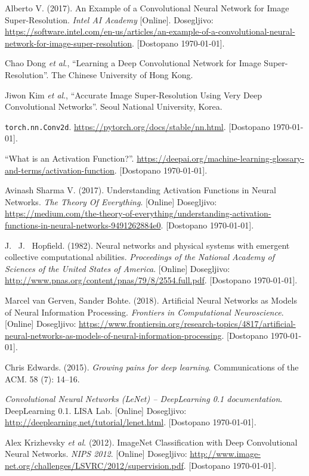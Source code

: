 \documentclass[a4paper,11pt,titlepage]{article}
\begin{document}
\begin{thebibliography}{99}


 Alberto V\@. (2017). An Example of a Convolutional Neural Network for Image Super-Resolution.
	\emph{Intel AI Academy} [Online]. Dosegljivo:
	\url{https://software.intel.com/en-us/articles/an-example-of-a-convolutional-neural-network-for-image-super-resolution}.
	[Dostopano \today].

 Chao Dong \emph{et al}., ``Learning a Deep Convolutional Network for Image Super-Resolution''. The Chinese University of Hong Kong.

 Jiwon Kim \emph{et al}., ``Accurate Image Super-Resolution Using Very Deep Convolutional Networks''.
	Seoul National University, Korea.

 \texttt{torch.nn.Conv2d}. \url{https://pytorch.org/docs/stable/nn.html}. [Dostopano \today].

 ``What is an Activation Function?''. \url{https://deepai.org/machine-learning-glossary-and-terms/activation-function}.
	[Dostopano \today].

 Avinash Sharma V\@. (2017). Understanding Activation Functions in Neural Networks. \emph{The Theory Of Everything}.
	[Online] Dosegljivo: \url{https://medium.com/the-theory-of-everything/understanding-activation-functions-in-neural-networks-9491262884e0}.
	[Dostopano \today].

 J.~ J.~ Hopfield. (1982). Neural networks and physical systems with emergent collective computational abilities.
	\emph{Proceedings of the National Academy of Sciences of the United States of America}. [Online] Dosegljivo:
	\url{http://www.pnas.org/content/pnas/79/8/2554.full.pdf}. [Dostopano \today].

 Marcel van Gerven, Sander Bohte. (2018). Artificial Neural Networks as Models of Neural Information Processing.
	\emph{Frontiers in Computational Neuroscience}. [Online] Dosegljivo:
	\url{https://www.frontiersin.org/research-topics/4817/artificial-neural-networks-as-models-of-neural-information-processing}.
	[Dostopano \today].

 Chris Edwards. (2015). \emph{Growing pains for deep learning}. Communications of the ACM. 58 (7): 14–16.

 \emph{Convolutional Neural Networks (LeNet) – DeepLearning 0.1 documentation}. DeepLearning 0.1. LISA Lab.
	[Online] Dosegljivo: \url{http://deeplearning.net/tutorial/lenet.html}. [Dostopano \today].

 Alex Krizhevsky \emph{et al}. (2012). ImageNet Classification with Deep Convolutional Neural Networks.
	\emph{NIPS 2012}. [Online] Dosegljivo: \url{http://www.image-net.org/challenges/LSVRC/2012/supervision.pdf}. [Dostopano \today].

\end{thebibliography}
\end{document}
